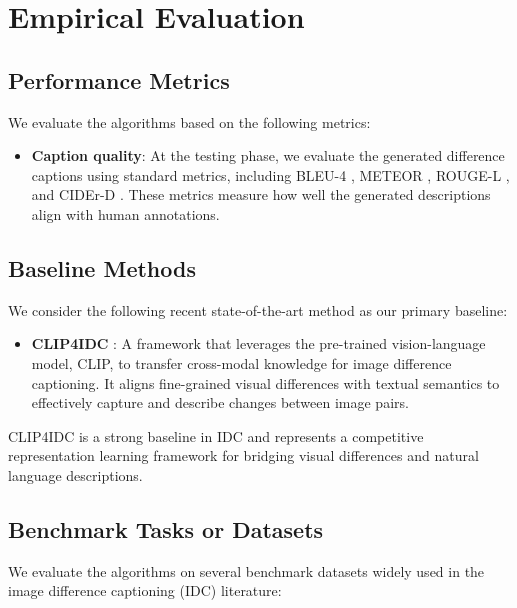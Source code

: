 \section{Empirical Evaluation}

\subsection{Performance Metrics}
We evaluate the algorithms based on the following metrics:

\begin{itemize}
    \item \textbf{Caption quality}: At the testing phase, we evaluate the generated difference captions using standard metrics, including BLEU-4 \citep{papineni2002bleu}, METEOR \citep{banerjee2005meteor}, ROUGE-L \citep{lin2004rouge}, and CIDEr-D \citep{vedantam2015cider}. These metrics measure how well the generated descriptions align with human annotations.
\end{itemize}

\subsection{Baseline Methods}
We consider the following recent state-of-the-art method as our primary baseline:

\begin{itemize}
    \item \textbf{CLIP4IDC} \citep{guo2022clip4idc}: A framework that leverages the pre-trained vision-language model, CLIP, to transfer cross-modal knowledge for image difference captioning. It aligns fine-grained visual differences with textual semantics to effectively capture and describe changes between image pairs.
\end{itemize}

CLIP4IDC is a strong baseline in IDC and represents a competitive representation learning framework for bridging visual differences and natural language descriptions.

\subsection{Benchmark Tasks or Datasets}
We evaluate the algorithms on several benchmark datasets widely used in the image difference captioning (IDC) literature:

